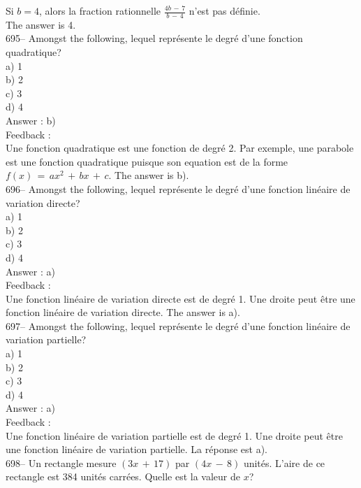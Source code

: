 \documentclass[letterpaper, 12pt]{article}
\begin{document}
Si $b=4$, alors la fraction rationnelle $\frac{4b\,-\,7}{b\,-\,4}$ n'est pas
d\'efinie.\\
The answer is 4.\\

695-- Amongst the following, lequel repr\'esente le degr\'e d'une
fonction quadratique?\\
a) 1\\
b) 2\\
c) 3\\
d) 4\\

Answer : b)\\

Feedback : \\
Une fonction quadratique est une fonction de degr\'e 2.  Par exemple, une
parabole est une fonction quadratique puisque son equation est de la forme
$f(x)\,=\,ax^2 \,+\, bx \,+\, c$.  The answer is b).\\

696-- Amongst the following, lequel repr\'esente le degr\'e d'une
fonction lin\'eaire de variation directe?\\
a) 1\\
b) 2\\
c) 3\\
d) 4\\

Answer : a)\\

Feedback : \\
Une fonction lin\'eaire de variation directe est de degr\'e 1.  Une droite
peut \^etre une fonction lin\'eaire de variation directe.  The answer is
a).\\

697-- Amongst the following, lequel repr\'esente le degr\'e d'une
fonction lin\'eaire de variation partielle?\\
a) 1\\
b) 2\\
c) 3\\
d) 4\\

Answer : a)\\

Feedback : \\
Une fonction lin\'eaire de variation partielle est de degr\'e 1.  Une droite
peut \^etre une fonction lin\'eaire de variation partielle.  La r\'eponse
est a).\\

698-- Un rectangle mesure $(3x\,+\,17)$ par $(4x\,-\,8)$ unit\'es.  L'aire
de ce rectangle est 384 unit\'es carr\'ees.  Quelle est la valeur de $x$?\\
\end{document}
